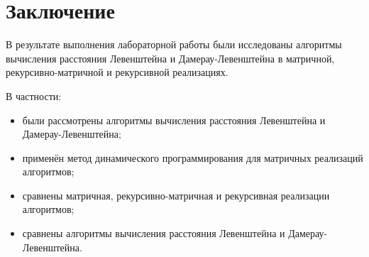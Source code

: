 \section*{Заключение}
В результате выполнения лабораторной работы были исследованы алгоритмы вычисления расстояния Левенштейна и Дамерау-Левенштейна в матричной, рекурсивно-матричной и рекурсивной реализациях.\par
В частности:\par
\begin{itemize}
\item были рассмотрены алгоритмы вычисления расстояния Левенштейна и Дамерау-Левенштейна;
\item применён метод динамического программирования для матричных реализаций алгоритмов;
\item сравнены матричная, рекурсивно-матричная и рекурсивная реализации алгоритмов;
\item сравнены алгоритмы вычисления расстояния Левенштейна и Дамерау-Левенштейна.
\end{itemize}
\newpage